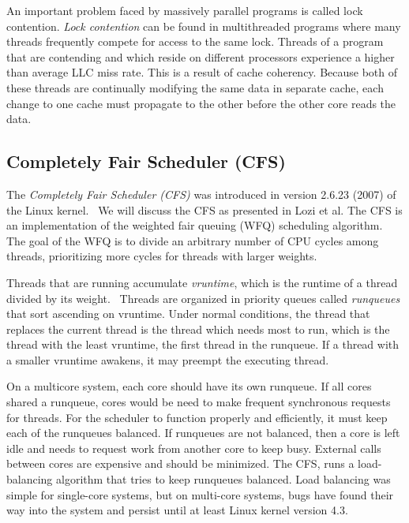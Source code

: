 \documentclass{sig-alternate}
\begin{document}
An important problem faced by massively parallel programs is called lock contention. \emph{Lock contention} can be found in multithreaded programs where many threads frequently compete for access to the same lock. Threads of a program that are contending and which reside on different processors experience a higher than average LLC miss rate. This is a result of cache coherency. Because both of these threads are continually modifying the same data in separate cache, each change to one cache must propagate to the other before the other core reads the data.


\subsection{Completely Fair Scheduler (CFS)}
\label{sec:cfs}

The \emph{Completely Fair Scheduler (CFS)} was introduced in version 2.6.23 (2007) of the Linux kernel.~\cite{Jo:2017} We will discuss the CFS as presented in Lozi et al. The CFS is an implementation of the weighted fair queuing (WFQ) scheduling algorithm. The goal of the WFQ is to divide an arbitrary number of CPU cycles among threads, prioritizing more cycles for threads with larger weights.~\cite{Lozi:2016}

Threads that are running accumulate \emph{vruntime}, which is the runtime of a thread divided by its weight.~\cite{SchedThesis} Threads are organized in priority queues called \emph{runqueues} that sort ascending on vruntime. Under normal conditions, the thread that replaces the current thread is the thread which needs most to run, which is the thread with the least vruntime, the first thread in the runqueue. If a thread with a smaller vruntime awakens, it may preempt the executing thread.~\cite{Lozi:2016}

On a multicore system, each core should have its own runqueue. If all cores shared a runqueue, cores would be need to make frequent synchronous requests for threads. For the scheduler to function properly and efficiently, it must keep each of the runqueues balanced. If runqueues are not balanced, then a core is left idle and needs to request work from another core to keep busy. External calls between cores are expensive and should be minimized. The CFS, runs a load-balancing algorithm that tries to keep runqueues balanced. Load balancing was simple for single-core systems, but on multi-core systems, bugs have found their way into the system and persist until at least Linux kernel version 4.3.~\cite{Lozi:2016}
\end{document}
